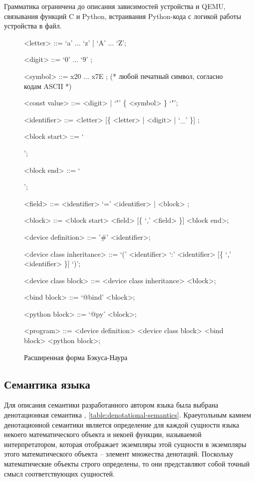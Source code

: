 Грамматика {\mylanguage} ограничена до описания зависимостей устройства и QEMU,
связывания функций C и Python, встраивания Python-кода с логикой работы устройства
в файл.


\setlength{\grammarparsep}{0.1cm}
\setlength{\grammarindent}{13em}
\begin{figure}[!htbp]
    \begin{grammar}
        <letter> ::= `a' ... `z' | `A' ... `Z';

        <digit> ::= `0' ... `9' ;

        <symbol> ::= x20 ... x7E ; (* любой печатный символ, согласно кодам ASCII *)

        <const value> ::= <digit> | `"' \{ <symbol> \} `"';

        <identifier> ::= <letter> [\{ <letter> | <digit> | `\_' \}] ;

        <block start> ::= `{';

        <block end> ::= `}';

        <field> ::= <identifier> `=' <identifier> | <block> ;

        <block> ::= <block start> <field> [\{ `,' <field> \}] <block end>;

        <device definition> ::= '\#' <identifier>;

        <device class inheritance> ::= `(' <identifier> `:' <identifier> [\{ `,' <identifier> \}] `)';

        <device class block> ::= <device class inheritance> <block>;

        <bind block> ::= `@bind' <block>;

        <python block> ::= `@py' <block>;

        <program> ::= <device definition> <device class block> <bind block> <python block>;
    \end{grammar}
    \caption{Расширенная форма Бэкуса-Наура \mylanguage}\label{fig:qpydev-grammar}
\end{figure}


\subsection{Семантика языка}\label{sec:ch2/sec2/sub3}

Для описания семантики разработанного автором языка была выбрана денотационная семантика \cite{denotational-semantics},
\cref{table:denotational-semantics}.
Краеугольным камнем денотационной семантики является определение для каждой сущности
языка некоего математического объекта и некоей функции, называемой интерпретатором,
которая отображает экземпляры этой сущности в экземпляры этого математического объекта -- элемент множества денотаций.
Поскольку математические объекты строго определены, то они представляют собой точный
смысл соответствующих сущностей.

